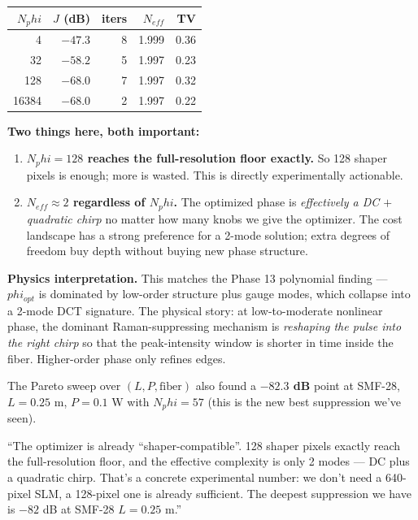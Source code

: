 \documentclass[11pt,letterpaper]{article}
\def\varphi{phi}\def\lambda{lambda}\def\mathrm#1{#1}%
\begin{document}
\begin{center}
\small
\begin{tabular}{rrrrr}
\toprule
$\mathrm{N}_\varphi$ & $J$ (dB) & iters & $\mathrm{N}_{\mathrm{eff}}$ & TV \\
\midrule
     4 & $-47.3$ &  8 & 1.999 & 0.36 \\
    32 & $-58.2$ &  5 & 1.997 & 0.23 \\
   128 & $-68.0$ &  7 & 1.997 & 0.32 \\
 16384 & $-68.0$ &  2 & 1.997 & 0.22 \\
\bottomrule
\end{tabular}
\end{center}

\textbf{Two things here, both important:}
\begin{enumerate}[leftmargin=*]
  \item \textbf{$\mathrm{N}_\varphi = 128$ reaches the full-resolution floor exactly.} So 128 shaper pixels is enough; more is wasted. This is directly experimentally actionable.
  \item \textbf{$\mathrm{N}_{\mathrm{eff}} \approx 2$ regardless of $\mathrm{N}_\varphi$.} The optimized phase is \emph{effectively a DC $+$ quadratic chirp} no matter how many knobs we give the optimizer. The cost landscape has a strong preference for a 2-mode solution; extra degrees of freedom buy depth without buying new phase structure.
\end{enumerate}

\textbf{Physics interpretation.} This matches the Phase 13 polynomial finding --- $\varphi_{\mathrm{opt}}$ is dominated by low-order structure plus gauge modes, which collapse into a 2-mode DCT signature. The physical story: at low-to-moderate nonlinear phase, the dominant Raman-suppressing mechanism is \emph{reshaping the pulse into the right chirp} so that the peak-intensity window is shorter in time inside the fiber. Higher-order phase only refines edges.

The Pareto sweep over $(L, P, \text{fiber})$ also found a \textbf{$-82.3$ dB} point at SMF-28, $L=0.25$ m, $P=0.1$ W with $\mathrm{N}_\varphi = 57$ (this is the new best suppression we've seen).

\begin{say}
``The optimizer is already ``shaper-compatible''. 128 shaper pixels exactly reach the full-resolution floor, and the effective complexity is only 2 modes --- DC plus a quadratic chirp. That's a concrete experimental number: we don't need a 640-pixel SLM, a 128-pixel one is already sufficient. The deepest suppression we have is $-82$ dB at SMF-28 $L=0.25$ m.''
\end{say}
\end{document}
